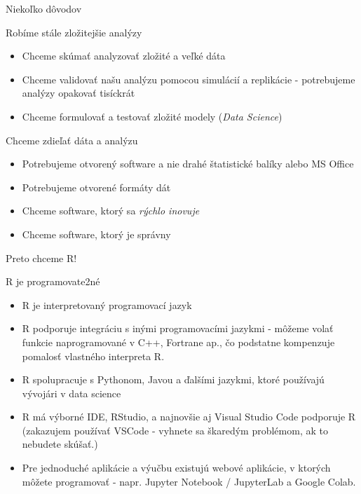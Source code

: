 \begin{frame}{Niekoľko dôvodov}
	\begin{block}{Robíme stále zložitejšie analýzy}
		\begin{itemize}
			\item Chceme skúmať analyzovať zložité a veľké dáta
			\item Chceme validovať našu analýzu pomocou simulácií a replikácie - potrebujeme analýzy opakovať tisíckrát
			\item Chceme formulovať a testovať zložité modely (\emph{Data Science})
		\end{itemize}
	\end{block}
	\begin{block}{Chceme zdieľať dáta a analýzu}
		\begin{itemize}
			\item Potrebujeme otvorený software a nie drahé štatistické balíky alebo MS Office
			\item Potrebujeme otvorené formáty dát
			\item Chceme software, ktorý sa \emph{rýchlo inovuje}
			\item Chceme software, ktorý je správny
		\end{itemize}
	\end{block}
\end{frame}

\begin{frame}{Preto chceme R!}
	\begin{block}{R je programovate2né}
		\begin{itemize}
			\item R je interpretovaný programovací jazyk
			\item R podporuje integráciu s inými programovacími jazykmi - môžeme volať funkcie naprogramované v C++, Fortrane ap., čo podstatne kompenzuje pomalosť vlastného interpreta R.
			\item R spolupracuje s Pythonom, Javou a ďalšími jazykmi, ktoré používajú vývojári v data science
			\item R má výborné IDE, RStudio, a najnovšie aj Visual Studio Code podporuje R (\alert{zakazujem používať VSCode} - vyhnete sa škaredým problémom, ak to nebudete skúšať.)
			\item Pre jednoduché aplikácie a výučbu existujú webové aplikácie, v ktorých môžete programovať - napr. Jupyter Notebook / JupyterLab a Google Colab.
		\end{itemize}
	\end{block}
\end{frame}

